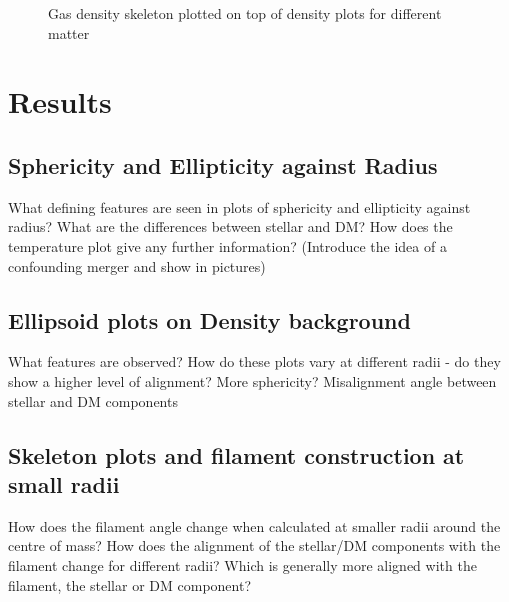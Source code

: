\documentclass[journal]{IEEEtran}
\begin{document}
\begin{figure}[!t]
\centering
\hfil
\caption{Gas density skeleton plotted on top of density plots for different matter}
\label{density_skel}
\end{figure}

\section{Results}
\subsection{Sphericity and Ellipticity against Radius}
What defining features are seen in plots of sphericity and ellipticity against radius? What are the differences between stellar and DM? How does the temperature plot give any further information?
(Introduce the idea of a confounding merger and show in pictures)
\subsection{Ellipsoid plots on Density background}
What features are observed? How do these plots vary at different radii - do they show a higher level of alignment? More sphericity? 
Misalignment angle between stellar and DM components
\subsection{Skeleton plots and filament construction at small radii}
How does the filament angle change when calculated at smaller radii around the centre of mass?
How does the alignment of the stellar/DM components with the filament change for different radii?
Which is generally more aligned with the filament, the stellar or DM component?
\end{document}
